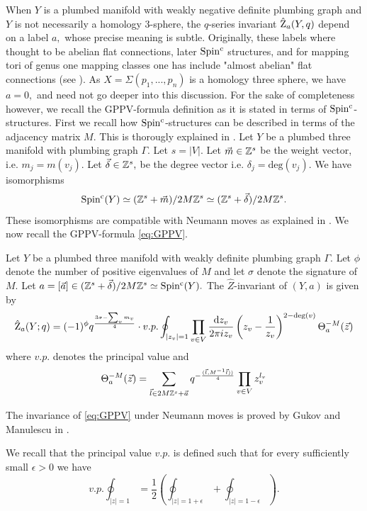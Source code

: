   When $Y$ is a plumbed manifold with weakly negative definite plumbing graph and $Y$ is not necessarily a homology $3$-sphere, the $q$-series invariant $\hat{\operatorname{Z}}_a(Y,q)$ depend on a label $a,$ whose precise  meaning is subtle. Originally, these labels where thought to be abelian flat connections, later $\operatorname{Spin^c}$ structures, and for mapping tori of genus one mapping classes one has include "almost abelian" flat connections (see \cite{2019arXiv191108456C}). As $X=\Sigma(p_1,...,p_n)$ is a homology three sphere, we have $a=0,$ and need not go deeper into this discussion. For the sake of completeness however, we recall the GPPV-formula definition as it is stated in terms of $\operatorname{Spin^c}$-structures. First we recall how $\operatorname{Spin^c}$-structures can be described in terms of the adjacency matrix $M.$ This is thorougly explained in \cite{GukovCiprian19}. Let $Y$ be a plumbed three manifold with plumbing graph $\Gamma.$ Let $s=\lvert V \rvert.$ Let $\vec{m} \in \mathbb{Z}^{s}$ be the weight vector, i.e. $m_j=m(v_j).$ Let $\vec{\delta} \in \mathbb{Z}^s,$  be the degree vector i.e. $\delta_j=\text{deg}(v_j).$ We have isomorphisms $$
  \operatorname{Spin^c}(Y) \simeq (\mathbb{Z}^s+\vec{m})/ 2M\mathbb{Z}^s \simeq (\mathbb{Z}^s+\vec{\delta})/ 2M\mathbb{Z}^s.$$
  These isomorphisms  are compatible with Neumann moves as explained in \cite{GukovCiprian19}. We now recall the GPPV-formula \eqref{eq:GPPV}.
  \begin{definition} \label{df:GPPV}
  	Let $Y$ be a plumbed three manifold with weakly definite plumbing graph $\Gamma.$ Let $\phi$ denote the number of positive eigenvalues of $M$ and let $\sigma$ denote the signature of $M.$ Let $a=[ \vec{a}] \in (\mathbb{Z}^s+\vec{\delta})/ 2M\mathbb{Z}^s \simeq \operatorname{Spin^c}(Y).$ The $\hat{Z}$-invariant of $(Y,a)$ is given by 
  	\begin{equation} \label{eq:GPPV}
  	\hat{\operatorname{Z}}_a(Y;q)=(-1)^{\phi}q^{\frac{3\sigma-\sum_v m_v}{4}} \cdot v.p. \oint_{\lvert z_v \rvert=1} \prod_{v\in V} \frac{\operatorname{{d}\hskip-.6mm} z_v}{2\pi iz_v}\left(z_v-\frac{1}{z_v}\right)^{2-\text{deg}(v)} \Theta_a^{-M}(\vec{z})
  	\end{equation}
  	where $v.p.$ denotes the principal value and
  	\begin{equation} \Theta_a^{-M}(\vec{z})=\sum_{\vec{l}\in 2M\mathbb{Z}^s+\vec{a}}
  	q^{-\frac{(\vec{l},M^{-1}\vec{l}))}{4}} \prod_{v \in V} z_v^{l_v}
  	\end{equation}
  \end{definition}
  \begin{remark} The invariance of \eqref{eq:GPPV} under Neumann moves is proved by Gukov and Manulescu in \cite{GukovCiprian19}. \end{remark} We recall that the principal value $v.p.$ is defined such that for every sufficiently small $\epsilon >0$ we have $$v.p. \oint_{\lvert z \rvert =1}= \frac{1}{2}\left(\oint_{\lvert z \rvert =1+\epsilon}+\oint_{\lvert z \rvert =1-\epsilon}\right).$$  
  
